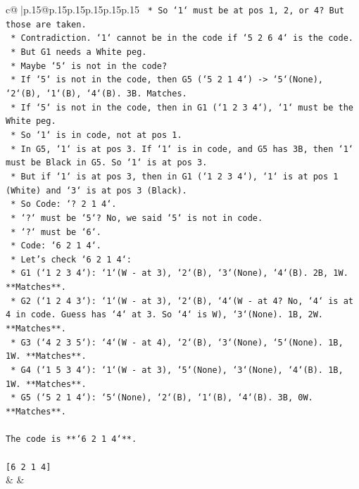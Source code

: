 \documentclass{article}
\begin{document}
{\begin{supertabular}{c@{$\;$}|p{.15\linewidth}@{}p{.15\linewidth}p{.15\linewidth}p{.15\linewidth}p{.15\linewidth}p{.15\linewidth}}
{{{\texttt{    *   So `1` must be at pos 1, 2, or 4? But those are taken.} \\
\texttt{    *   Contradiction. `1` cannot be in the code if `5 2 6 4` is the code.} \\
\texttt{    *   But G1 needs a White peg.} \\
\texttt{    *   Maybe `5` is not in the code?} \\
\texttt{    *   If `5` is not in the code, then G5 (`5 2 1 4`) {-}> `5`(None), `2`(B), `1`(B), `4`(B). 3B. Matches.} \\
\texttt{    *   If `5` is not in the code, then in G1 (`1 2 3 4`), `1` must be the White peg.} \\
\texttt{    *   So `1` is in code, not at pos 1.} \\
\texttt{    *   In G5, `1` is at pos 3. If `1` is in code, and G5 has 3B, then `1` must be Black in G5. So `1` is at pos 3.} \\
\texttt{    *   But if `1` is at pos 3, then in G1 (`1 2 3 4`), `1` is at pos 1 (White) and `3` is at pos 3 (Black).} \\
\texttt{    *   So Code: `? 2 1 4`.} \\
\texttt{    *   `?` must be `5`? No, we said `5` is not in code.} \\
\texttt{    *   `?` must be `6`.} \\
\texttt{    *   Code: `6 2 1 4`.} \\
\texttt{    *   Let's check `6 2 1 4`:} \\
\texttt{        *   G1 (`1 2 3 4`): `1`(W {-} at 3), `2`(B), `3`(None), `4`(B). 2B, 1W. **Matches**.} \\
\texttt{        *   G2 (`1 2 4 3`): `1`(W {-} at 3), `2`(B), `4`(W {-} at 4? No, `4` is at 4 in code. Guess has `4` at 3. So `4` is W), `3`(None). 1B, 2W. **Matches**.} \\
\texttt{        *   G3 (`4 2 3 5`): `4`(W {-} at 4), `2`(B), `3`(None), `5`(None). 1B, 1W. **Matches**.} \\
\texttt{        *   G4 (`1 5 3 4`): `1`(W {-} at 3), `5`(None), `3`(None), `4`(B). 1B, 1W. **Matches**.} \\
\texttt{        *   G5 (`5 2 1 4`): `5`(None), `2`(B), `1`(B), `4`(B). 3B, 0W. **Matches**.} \\
\\ 
\texttt{The code is **`6 2 1 4`**.} \\
\\ 
\texttt{{[}6 2 1 4{]}} \\
            }
        }
    }
    & & \\ \\


\end{supertabular}}
\end{document}
